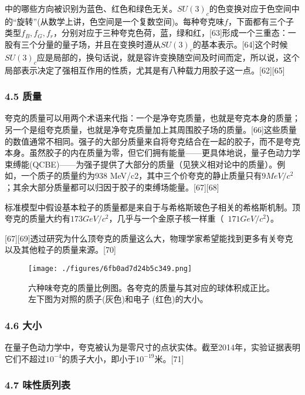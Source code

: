中的哪些方向被识别为蓝色、红色和绿色无关。$SU(3)_c$的色变换对应于色空间中的“旋转”(从数学上讲，色空间是一个复数空间)。每种夸克味$f$，下面都有三个子类型$f_{B},f_{G},f_{r}$，分别对应于三种夸克色荷，蓝，绿和红，[63]形成一个三重态：一股有三个分量的量子场，并且在变换时遵从$SU(3)_c$的基本表示。[64]这个时候$SU(3)_c$应是局部的，换句话说，就是容许变换随空间及时间而定，所以说，这个局部表示决定了强相互作用的性质，尤其是有八种载力用胶子这一点。[62][65]

\subsubsection{4.5 质量}
夸克的质量可以用两个术语来代指：一个是净夸克质量，也就是夸克本身的质量；另一个是组夸克质量，也就是净夸克质量加上其周围胶子场的质量。[66]这些质量的数值通常不相同。强子的大部分质量来自将夸克结合在一起的胶子，而不是夸克本身。虽然胶子的内在质量为零，但它们拥有能量——更具体地说，量子色动力学束缚能(QCBE)——为强子提供了大部分的质量（见狭义相对论中的质量）。例如，一个质子的质量约为938 MeV/c2，其中三个价夸克的静止质量只有$9MeV/c^2$；其余大部分质量都可以归因于胶子的束缚场能量。[67][68]

标准模型中假设基本粒子的质量都是来自于与希格斯玻色子相关的希格斯机制。顶夸克的质量大约有$173GeV/c^2$，几乎与一个金原子核一样重（~$171GeV/c^2$）。

[67][69]透过研究为什么顶夸克的质量这么大，物理学家希望能找到更多有关夸克以及其他粒子的质量来源。[70]

\begin{figure}[ht]
\centering
\texttt{[image: ./figures/6fb0ad7d24b5c349.png]}
\caption{六种味夸克的质量比例图。各夸克的质量与其对应的球体积成正比。左下图为对照的质子(灰色)和电子 (红色)的大小。} \label{fig_Quark_10}
\end{figure}

\subsubsection{4.6 大小}
在量子色动力学中，夸克被认为是零尺寸的点状实体。截至2014年，实验证据表明它们不超过$10^{-4}$的质子大小，即小于$10^{-19}$米。[71]

\subsubsection{4.7 味性质列表}



